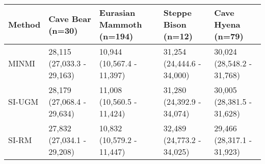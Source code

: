 
\begin{tabular}{lllll}
\toprule
Method & Cave Bear (n=30) & Eurasian Mammoth (n=194) & Steppe Bison (n=12) & Cave Hyena (n=79)\\
\midrule
MINMI & 28,115 (27,033.3 - 29,163) & 10,944 (10,567.4 - 11,397) & 31,254 (24,444.6 - 34,000) & 30,024 (28,548.2 - 31,768)\\
SI-UGM & 28,179 (27,068.4 - 29,634) & 11,008 (10,560.5 - 11,424) & 31,280 (24,392.9 - 34,074) & 30,005 (28,381.5 - 31,628)\\
SI-RM & 27,832 (27,034.1 - 29,208) & 10,832 (10,579.2 - 11,447) & 32,489 (24,773.2 - 34,025) & 29,466 (28,317.1 - 31,923)\\
\bottomrule
\end{tabular}
